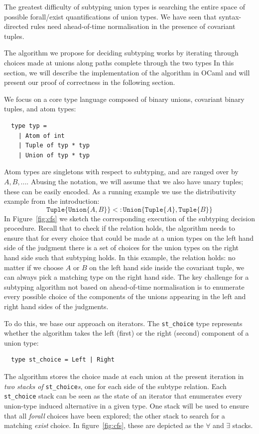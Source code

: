 \documentclass[a4paper,english]{lipics-v2019}
\newcommand{\xt}[1]{\texttt{#1}}
\newcommand{\union}[2]{\xt{Union\{}#1,#2\xt{\}}}
\newcommand{\tuple}[1]{\xt{Tuple\{}#1\xt{\}}}
\begin{document}
The greatest difficulty of subtyping union types is searching the entire space
of possible forall/exist quantifications of union types. We have seen that
syntax-directed rules need ahead-of-time normalisation in the presence of
covariant tuples.

The algorithm we propose for deciding subtyping works by iterating through
choices made at unions along paths complete through the two types In this
section, we will describe the implementation of the algorithm in OCaml and
will present our proof of correctness in the following section.

We focus on a core type language composed of binary unions, covariant binary
tuples, and atom types:
\begin{small}
\begin{verbatim}
  type typ =
    | Atom of int
    | Tuple of typ * typ
    | Union of typ * typ
\end{verbatim}
\end{small}
Atom types are singletons with respect to subtyping, and are ranged
over by
\(A, B, ...\).  Abusing the
notation, we will assume that we also have unary
tuples; these can be easily encoded. As a running example we use the distributivity example from the
introduction:
$$\tuple{\union{A}{B}} <: \union{\tuple{A}}{\tuple{B}}$$
In Figure~\ref{fig:cfs} we sketch the corresponding
execution of the subtyping decision procedure.  Recall that to check
if the relation holds, the algorithm needs to ensure that for every choice 
that could be made at a union types on the left hand side of the
judgment there is a set of choices for the union types on the right hand
side such that subtyping holds. In this example, the relation holds: no
matter if we choose $A$ or $B$ on the left hand side inside the
covariant tuple, we can always pick a matching type on the right hand
side. The key challenge for a subtyping algorithm not based on
ahead-of-time normalisation is to enumerate
every possible choice of the components of the unions appearing in the
left and right hand sides of the judgments.

To do this, we base our approach on iterators. The \verb|st_choice|
type represents whether the algorithm takes the left (first) or the
right (second)
component of a union type:
\begin{small}
\begin{verbatim}
  type st_choice = Left | Right
\end{verbatim}
\end{small}
The algorithm stores
the choice made at each union at the present iteration in \emph{two stacks of}
\verb|st_choice|\emph{s}, one for each side of the subtype relation. 
Each \verb|st_choice| stack can be seen as the state of an iterator that
enumerates every union-type induced alternative in a given type.  One
stack will be used to ensure that all \emph{forall} choices have been
explored; the other stack to search for a matching \emph{exist} choice.
In figure~\ref{fig:cfs}, these are depicted as the $\forall$ and $\exists$ stacks.
\end{document}
